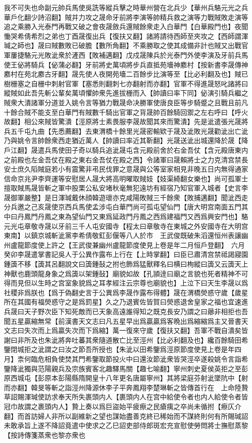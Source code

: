 我不可失也命副元帥兵馬使吳詵等縱兵擊之時華州營在北兵少【華州兵駱元光之兵華戶化翻少詩沼翻】賊并力攻之晟命牙前將李演等帥精兵救之演等力戰賊敗走演等追之乘勝入光泰門再戰又破之會夜晟斂兵還賊餘衆走入白華門【白華殿門也】夜聞慟哭希倩希烈之弟也丁酉晟復出兵【復扶又翻】諸將請待西師至夾攻之【西師謂渾瑊之師也】晟曰賊數敗已破膽【數所角翻】不乘勝取之使其成備非計也賊又出戰官軍屢捷駱元光敗泚衆於滻西【敗補邁翻】戊戍晟陳兵於光泰門外使李演及牙前兵馬使王佖將騎兵【佖蒲必翻】牙前將史萬頃將步兵直抵苑墻神䴥村【按新書李晟傳神䴥村在苑北䴥古牙翻】晟先使人夜開苑墻二百餘步比演等至【比必利翻及也】賊已樹栅塞之自栅中刺射官軍【塞悉則翻刺七亦翻射而亦翻】官軍不得進晟怒叱諸將曰縱賊如此吾先斬公輩矣萬頃懼帥衆先進拔栅而入【帥讀曰率下同】佖演引騎兵繼之賊衆大潰諸軍分道並入姚令言等猶力戰晟命决勝軍使唐良臣等步騎蹙之且戰且前凡十餘合賊不能支至白華門有賊數千騎出官軍之背晟帥百餘騎回禦之左右呼曰【呼火故翻】相公來賊皆驚潰【涇原將士素畏服李晟故聞其來而驚潰】先是泚遣張光晟將兵五千屯九曲【先悉薦翻】去東渭橋十餘里光晟密輸欵于晟及泚敗光晟勸泚出亡泚乃與姚令言帥餘衆西走猶近萬人【帥讀曰率近其靳翻】光晟送泚出城還降於晟【降戶江翻】晟遣兵馬使田子奇以騎兵追泚晟屯含元殿前舍於右金吾仗【含元殿唐東内之前殿也左金吾仗在殿之東右金吾仗在殿之西】令諸軍曰晟賴將士之力克清宫禁長安士庶久䧟賊庭若小有震驚非弔民伐罪之意晟與公等室家相見非晚五日内無得通家信命京兆尹李齊運等安慰居人晟大將高明曜取賊妓【妓渠綺翻女樂也】尚可孤軍士擅取賊馬晟皆斬之軍中股栗公私安堵秋毫無犯遠坊有經宿乃知官軍入城者【史言李晟御軍嚴整】是日渾瑊戴休顔韓遊瓌亦克咸陽敗賊三千餘衆【敗捕邁翻】聞泚西走分兵邀之己亥晟使京西兵馬使孟涉屯白華門尚可孤屯望仙門【唐大明宫南面五門其中曰丹鳳門丹鳳之東為望仙門又東爲延政門丹鳳之西爲建福門又西爲興安門也】駱元光屯章敬寺晟以牙前三千人屯安國寺【程太曰章敬寺在東城之外安國寺在大明宫東南】以鎮京城斬泚黨李希倩敬釭彭偃等八人於市　王武俊既破朱滔還恒州表讓幽州盧龍節度使上許之【王武俊兼幽州盧龍節度使見上卷是年二月恒戶登翻】　六月癸卯李晟遣掌書記吳人于公異作露布上行在【上時掌翻】曰臣已肅清宫禁祗謁寢園鍾簴不移【簴其呂翻說文曰簴鍾鼔之拊也飾爲猛獸釋名曰横曰栒縱曰簴又云簴天上神獸也鹿頭龍身象之爲簴以架鍾鼔】廟貌如故【孔頴逹曰廟之言貌也死者精神不可得而見但以生時之宫室象貌爲之耳孝經注云宗尊也廟貌也】上泣下曰天生李晟以爲社稷非爲朕也【爲于偽翻史言于公異爲李晟作露布得體】晟在渭橋熒惑守歲【歲星所在其國有福熒惑守之是爲罰星】久之乃退賓佐皆賀曰熒惑退舍皇家之福也宜速進兵晟曰天子野次臣下知死敵而已天象高遠誰得知之既克長安乃謂之曰曏非相拒也吾聞五星贏縮無常【前漢書天文志曰凡五星早出爲贏贏爲客晩出爲縮縮爲主又晉書天文志曰失次而上爲贏失次而下爲縮】萬一復來守歲【復扶又翻】吾軍不戰自潰矣皆謝曰非所及也朱泚將奔吐蕃其衆隨道散亡比至涇州【比必利翻及也】纔百餘騎田希鑒閉城拒之泚謂之曰汝之節吾所授也【朱泚以田希鑒爲涇原節度使見上卷是年四月】柰何臨危相負使焚其門希鑒取節投火中曰還汝節泚衆皆哭涇卒遂殺姚令言詣希鑒降泚獨與范陽親兵及宗族賓客北趣驛馬關【趣七喻翻】寧州刺史夏侯英拒之至彭原西城屯【彭原本彭陽縣隋開皇十八年更名唐屬寧州】其將梁庭芬射泚墜阬中【射而亦翻】韓旻等斬之詣涇州降源休李子平奔鳳翔李楚琳斬之皆傳首行在　上命陸贄草詔賜渾瑊使訪求奉天所失裹頭内人【裹頭内人在宫中給使令者也内人給使令者皆冠巾故謂之裹頭内人】贄上奏以爲巨盜始平疲瘵之民瘡痍之卒尚未循拊【瘵仄介翻】而首訪婦人非所以副維新之望也謀始盡善克終已稀始而不謀終則何有所賜瑊詔未敢承旨上遂不降詔竟遣中使求之乙巳詔吏部侍郎斑宏充宣慰使勞問將士撫慰蒸黎【按詩傳箋蒸衆也黎亦衆也